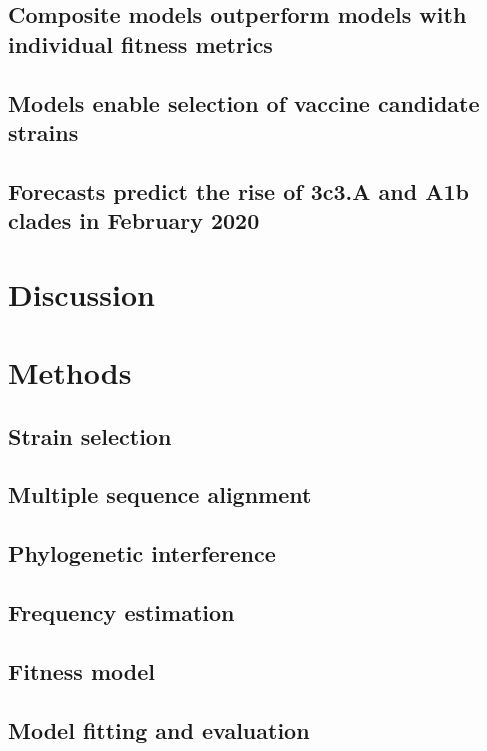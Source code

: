 \subsection*{Composite models outperform models with individual fitness metrics}

\subsection*{Models enable selection of vaccine candidate strains}

\subsection*{Forecasts predict the rise of 3c3.A and A1b clades in February 2020}

\section*{Discussion}

\section*{Methods}

\subsection*{Strain selection}

\subsection*{Multiple sequence alignment}

\subsection*{Phylogenetic interference}

\subsection*{Frequency estimation}

\subsection*{Fitness model}

\subsection*{Model fitting and evaluation}

